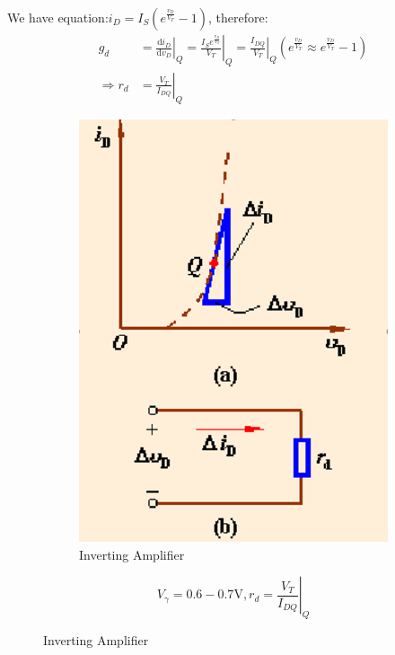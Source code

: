 \documentclass[a4paper,11pt,UTF8]{article}
\begin{document}
We have equation:$\displaystyle i_D=I_S(e^{\frac{v_D}{V_T}}-1)$, therefore:
$$\begin{aligned}
	g_d&=\left.\frac{\mathrm{d}i_D}{\mathrm{d}v_D}\right|_Q=\left.\frac{I_Se^{\frac{v_D}{V_T}}}{V_T}\right|_Q=\left.\frac{I_{DQ}}{V_T}\right|_Q(e^{\frac{v_D}{V_T}}\approx e^{\frac{v_D}{V_T}}-1)\\
	\Rightarrow r_d&=\left.\frac{V_T}{I_{DQ}}\right|_Q
\end{aligned}	
$$
\begin{figure}[H]
	\begin{minipage}{.5\textwidth}
		\begin{figure}[H] 
			\centering 
			\includegraphics[scale=0.4]{./img/1.4}
			\caption{Inverting Amplifier}
		\end{figure}
	\end{minipage}
	\begin{minipage}{.5\textwidth}
		\LARGE{$$
			V_\gamma=0.6-0.7\mathrm{V}, r_d=\left.\frac{V_T}{I_{DQ}}\right|_Q
			$$}
	\end{minipage}
\end{figure}
\end{document}
